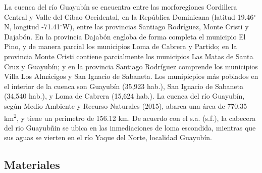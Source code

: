 \documentclass[11pt,]{article}
\begin{document}
La cuenca del río Guayubín se encuentra entre las morforegiones
Cordillera Central y Valle del Cibao Occidental, en la República
Dominicana (latitud 19.46\(^\circ\)N, longitud -71.41\(^\circ\)W), entre
las provincias Santiago Rodríguez, Monte Cristi y Dajabón. En la
provincia Dajabón engloba de forma completa el municipio El Pino, y de
manera parcial los municipios Loma de Cabrera y Partido; en la provincia
Monte Cristi contiene parcialmente los municipios Las Matas de Santa
Cruz y Guayubín; y en la provincia Santiago Rodríguez comprende los
municipios Villa Los Almácigos y San Ignacio de Sabaneta. Los
munipicpios más poblados en el interior de la cuenca son Guayubín
(35,923 hab.), San Ignacio de Sabaneta (34,540 hab.), y Loma de Cabrera
(15,624 hab.). La cuenca del río Guayubín, según Medio Ambiente y
Recurso Naturales (2015), abarca una área de 770.35
km\textsuperscript{2}, y tiene un perimetro de 156.12 km. De acuerdo con
el s.a. (s.f.), la cabecera del rio Guayubñin se ubica en las
inmediaciones de loma escondida, mientras que sus aguas se vierten en el
río Yaque del Norte, localidad Guayubín.

\subsection{Materiales}\label{materiales}
\end{document}
